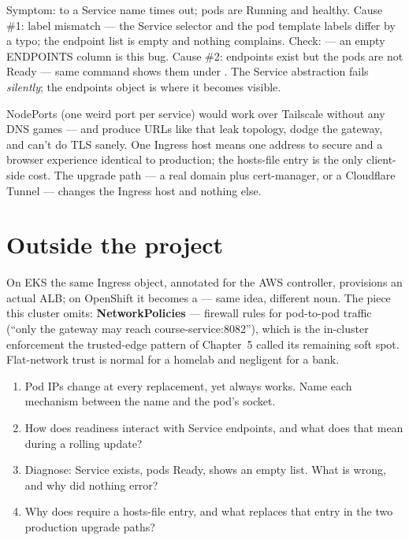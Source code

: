 \begin{pitfall}
Symptom:  to a Service name times out; pods are Running and
healthy. Cause \#1: label mismatch --- the Service selector and the pod
template labels differ by a typo; the endpoint list is empty and
nothing complains. Check:  --- an empty ENDPOINTS column is this bug. Cause \#2:
endpoints exist but the pods are not Ready --- same command shows them
under . The Service abstraction fails
\emph{silently}; the endpoints object is where it becomes visible.
\end{pitfall}

\begin{decision}
NodePorts (one weird port per service) would work over Tailscale
without any DNS games --- and produce URLs like
 that leak topology, dodge the gateway, and
can't do TLS sanely. One Ingress host means one address to secure and
a browser experience identical to production; the 
hosts-file entry is the only client-side cost. The upgrade path ---
a real domain plus cert-manager, or a Cloudflare Tunnel --- changes the
Ingress host and nothing else.
\end{decision}

\section{Outside the project}

On EKS the same Ingress object, annotated for the AWS controller,
provisions an actual ALB; on OpenShift it becomes a  ---
same idea, different noun. The piece this cluster omits:
\textbf{NetworkPolicies} --- firewall rules for pod-to-pod traffic
(``only the gateway may reach course-service:8082''), which is the
in-cluster enforcement the trusted-edge pattern of Chapter~5 called
its remaining soft spot. Flat-network trust is normal for a homelab
and negligent for a bank.

\begin{quiz}
\begin{enumerate}
  \item Pod IPs change at every replacement, yet
   always works. Name each mechanism between
  the name and the pod's socket.
  \item How does readiness interact with Service endpoints, and what
  does that mean during a rolling update?
  \item Diagnose: Service exists, pods Ready, 
  shows an empty list. What is wrong, and why did nothing error?
  \item Why does  require a hosts-file entry, and what
  replaces that entry in the two production upgrade paths?
\end{enumerate}
\end{quiz}
